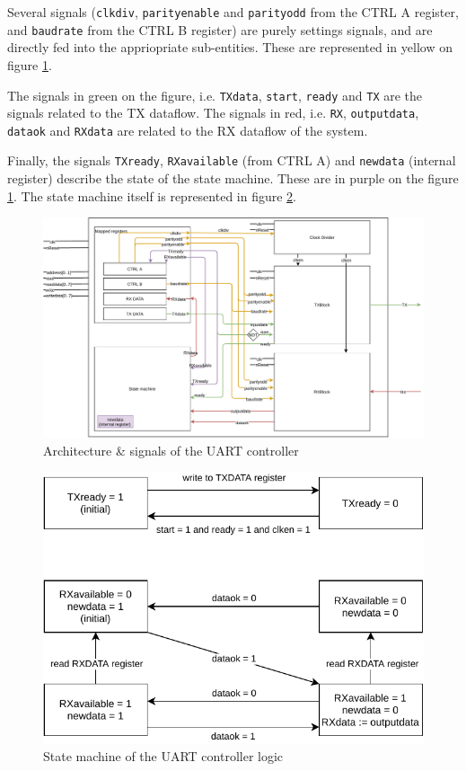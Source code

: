\documentclass[12pt,a4paper]{article}
\begin{document}
Several signals (\texttt{clkdiv}, \texttt{parityenable} and \texttt{parityodd} from the CTRL A register, and \texttt{baudrate} from the CTRL B register) are purely settings signals, and are directly fed into the appriopriate sub-entities. These are represented in yellow on figure \ref{fig:architecture}.

The signals in green on the figure, i.e. \texttt{TXdata}, \texttt{start}, \texttt{ready} and \texttt{TX} are the signals related to the TX dataflow. The signals in red, i.e. \texttt{RX}, \texttt{outputdata}, \texttt{dataok} and \texttt{RXdata} are related to the RX dataflow of the system.

Finally, the signals \texttt{TXready}, \texttt{RXavailable} (from CTRL A) and \texttt{newdata} (internal register) describe the state of the state machine. These are in purple on the figure \ref{fig:architecture}. The state machine itself is represented in figure \ref{fig:smsys}.


\begin{figure}[p]
	\centering
	\includegraphics[width=\textwidth]{architecture}
	\caption{Architecture \& signals of the UART controller}
	\label{fig:architecture}
\end{figure}

\begin{figure}[p]
	\centering
	\includegraphics[width=.7\textwidth]{smsys}
	\caption{State machine of the UART controller logic}
	\label{fig:smsys}
\end{figure}
\end{document}
